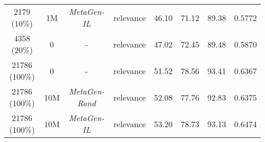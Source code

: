 \documentclass{article}
\begin{document}
\begin{table*}[t]
\begin{center}
\begin{small}
\begin{sc}
\begin{tabular}{c c c c c c c c}
2179 (10\%) & 1M&\textit{MetaGen-IL}& relevance& 46.10 & 71.12 & 89.38 & 0.5772 \\ 
4358 (20\%) & 0 & - & relevance & 47.02 & 72.45 & 89.48 & 0.5870 \\
\midrule
21786 (100\%)&0 & -&  relevance& 51.52 & 78.56 & 93.41 & 0.6367 \\
21786 (100\%)& 10M & \textit{MetaGen-Rand}& relevance & 52.08 & 77.76 & 92.83 & 0.6375 \\
21786 (100\%)& 10M & \textit{MetaGen-IL}& relevance & 53.20 & 78.73 & 93.13 & 0.6474 \\
\bottomrule
\end{tabular}
\end{sc}
\end{small}
\end{center}
\vskip -0.1in
\end{table*}
\end{document}
